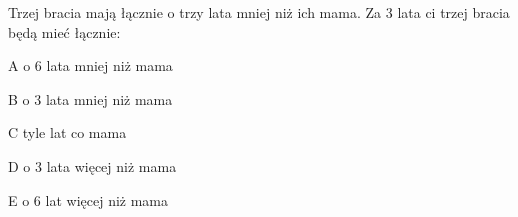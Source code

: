 \begin{tresc}
Trzej bracia mają łącznie o trzy lata mniej niż ich mama. Za 3 lata ci trzej bracia będą mieć łącznie:
\end{tresc}
\begin{wariant}{A} o 6 lata mniej niż mama \end{wariant}
\begin{wariant}{B} o 3 lata mniej niż mama \end{wariant}
\begin{wariant}{C} tyle lat co mama \end{wariant}
\begin{wariant}{D} o 3 lata więcej niż mama \end{wariant}
\begin{wariant}{E} o 6 lat więcej niż mama \end{wariant}
